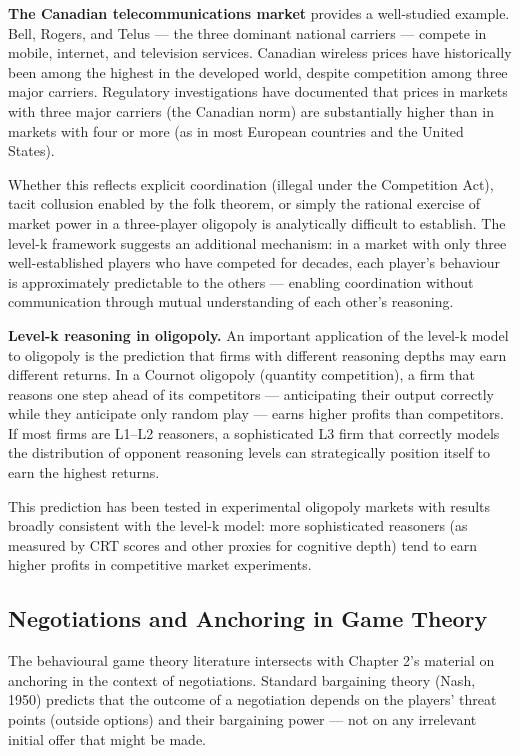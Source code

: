 \documentclass[12pt, letterpaper]{article}
\begin{document}
\textbf{The Canadian telecommunications market} provides a well-studied example. Bell, Rogers, and Telus --- the three dominant national carriers --- compete in mobile, internet, and television services. Canadian wireless prices have historically been among the highest in the developed world, despite competition among three major carriers. Regulatory investigations have documented that prices in markets with three major carriers (the Canadian norm) are substantially higher than in markets with four or more (as in most European countries and the United States).

Whether this reflects explicit coordination (illegal under the Competition Act), tacit collusion enabled by the folk theorem, or simply the rational exercise of market power in a three-player oligopoly is analytically difficult to establish. The level-k framework suggests an additional mechanism: in a market with only three well-established players who have competed for decades, each player's behaviour is approximately predictable to the others --- enabling coordination without communication through mutual understanding of each other's reasoning.

\textbf{Level-k reasoning in oligopoly.} An important application of the level-k model to oligopoly is the prediction that firms with different reasoning depths may earn different returns. In a Cournot oligopoly (quantity competition), a firm that reasons one step ahead of its competitors --- anticipating their output correctly while they anticipate only random play --- earns higher profits than competitors. If most firms are L1--L2 reasoners, a sophisticated L3 firm that correctly models the distribution of opponent reasoning levels can strategically position itself to earn the highest returns.

This prediction has been tested in experimental oligopoly markets with results broadly consistent with the level-k model: more sophisticated reasoners (as measured by CRT scores and other proxies for cognitive depth) tend to earn higher profits in competitive market experiments.


\subsection{Negotiations and Anchoring in Game Theory}


The behavioural game theory literature intersects with Chapter 2's material on anchoring in the context of negotiations. Standard bargaining theory (Nash, 1950) predicts that the outcome of a negotiation depends on the players' threat points (outside options) and their bargaining power --- not on any irrelevant initial offer that might be made.
\end{document}
